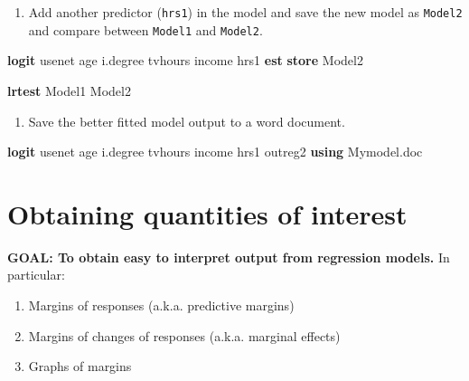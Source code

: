 \documentclass[
]{book}
\newenvironment{Shaded}{\begin{snugshade}}{\end{snugshade}}
\newcommand{\KeywordTok}[1]{\textcolor[rgb]{0.13,0.29,0.53}{\textbf{#1}}}
\newcommand{\NormalTok}[1]{#1}
\providecommand{\tightlist}{%
  \setlength{\itemsep}{0pt}\setlength{\parskip}{0pt}}
\begin{document}
\begin{enumerate}
\def\labelenumi{\arabic{enumi}.}
\setcounter{enumi}{1}
\tightlist
\item
  Add another predictor (\texttt{hrs1}) in the model and save the new model as \texttt{Model2} and compare between \texttt{Model1} and \texttt{Model2}.
\end{enumerate}

\begin{Shaded}
\begin{Highlighting}[]
\KeywordTok{logit}\NormalTok{ usenet age i.degree tvhours income hrs1}
\KeywordTok{est} \KeywordTok{store}\NormalTok{ Model2 }

\KeywordTok{lrtest}\NormalTok{ Model1 Model2}
\end{Highlighting}
\end{Shaded}

\begin{enumerate}
\def\labelenumi{\arabic{enumi}.}
\setcounter{enumi}{2}
\tightlist
\item
  Save the better fitted model output to a word document.
\end{enumerate}

\begin{Shaded}
\begin{Highlighting}[]
\KeywordTok{logit}\NormalTok{ usenet age i.degree tvhours income hrs1}
\NormalTok{outreg2 }\KeywordTok{using}\NormalTok{ Mymodel.doc}
\end{Highlighting}
\end{Shaded}

\hypertarget{obtaining-quantities-of-interest}{%
\section{Obtaining quantities of interest}\label{obtaining-quantities-of-interest}}

\textbf{GOAL: To obtain easy to interpret output from regression models.} In particular:

\begin{enumerate}
\def\labelenumi{\arabic{enumi}.}
\tightlist
\item
  Margins of responses (a.k.a. predictive margins)
\item
  Margins of changes of responses (a.k.a. marginal effects)
\item
  Graphs of margins
\end{enumerate}
\end{document}
